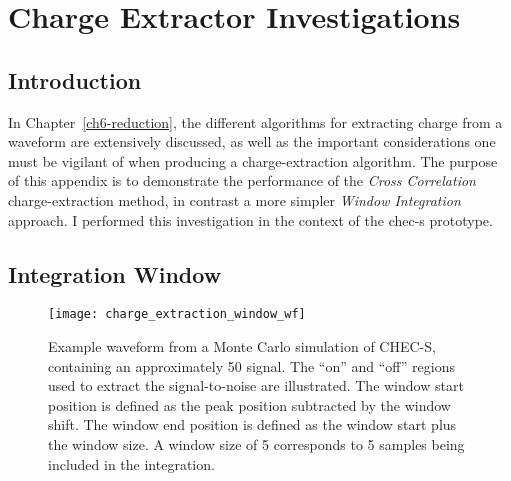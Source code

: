 \chapter{\label{a5-extractors}Charge Extractor Investigations}

\minitoc

\section{Introduction}

In Chapter~\ref{ch6-reduction}, the different algorithms for extracting charge from a waveform are extensively discussed, as well as the important considerations one must be vigilant of when producing a charge-extraction algorithm. The purpose of this appendix is to demonstrate the performance of the \textit{Cross Correlation} charge-extraction method, in contrast a more simpler \textit{Window Integration} approach. I performed this investigation in the context of the \gls{chec-s} prototype.

\section{Integration Window}

\begin{figure}
  \texttt{[image: charge\_extraction\_window\_wf]}
  \caption[Definition of integration window on a waveform.]{Example waveform from a Monte Carlo simulation of CHEC-S, containing an approximately \SI{50}{\pe} signal. The ``on'' and ``off'' regions used to extract the signal-to-noise are illustrated. The window start position is defined as the peak position subtracted by the window shift. The window end position is defined as the window start plus the window size. A window size of 5 corresponds to 5 samples being included in the integration.}
  \label{fig:charge_extraction_window_wf}
\end{figure}

